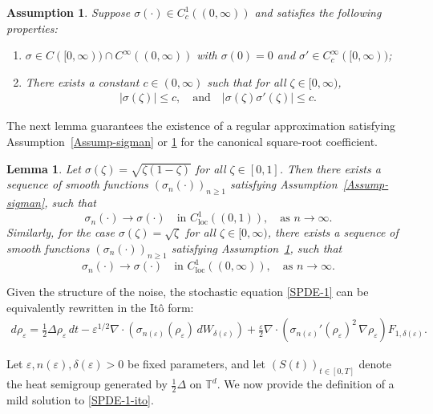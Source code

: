 \documentclass[UTF-8,reqno]{amsart}
\numberwithin{equation}{section}
\newtheorem{lemma}[theorem]{Lemma}
\newtheorem{assumption}{Assumption}[section]
\def\geq{\geqslant}
\def\leq{\leqslant}
\def\geq{\geqslant}
\def\leq{\leqslant}
\begin{document}
\begin{assumption}\label{Assump-sigman-sqrt}
Suppose $\sigma(\cdot) \in C^{1}_{c}((0,\infty))$ and satisfies the following properties:
\begin{enumerate}
    \item[(1)] $\sigma \in C([0,\infty)) \cap C^{\infty}((0,\infty))$ with $\sigma(0)=0$ and $\sigma' \in C^{\infty}_c([0,\infty))$;
    \item[(2)] There exists a constant $c \in (0,\infty)$ such that for all $\zeta \in [0,\infty)$,
    \begin{align}
        |\sigma(\zeta)| \leq c, \quad \text{and} \quad |\sigma(\zeta)\sigma'(\zeta)| \leq c.
    \end{align}
\end{enumerate}
\end{assumption}

The next lemma guarantees the existence of a regular approximation satisfying Assumption~\ref{Assump-sigman} or \ref{Assump-sigman-sqrt} for the canonical square-root coefficient.

\begin{lemma}\label{lem-sigma}
Let $\sigma(\zeta) = \sqrt{\zeta(1 - \zeta)}$ for all $\zeta \in [0,1]$. Then there exists a sequence of smooth functions $(\sigma_n(\cdot))_{n \geq 1}$ satisfying Assumption~\ref{Assump-sigman}, such that
$$
\sigma_n(\cdot) \longrightarrow \sigma(\cdot) \quad \text{in } C^1_{\mathrm{loc}}((0,1)), \quad \text{as } n \to \infty.
$$
Similarly, for the case $\sigma(\zeta) = \sqrt{\zeta}$ for all $\zeta \in [0,\infty)$, there exists a sequence of smooth functions $(\sigma_n(\cdot))_{n \geq 1}$ satisfying Assumption~\ref{Assump-sigman-sqrt}, such that
$$
\sigma_n(\cdot) \longrightarrow \sigma(\cdot) \quad \text{in } C^1_{\mathrm{loc}}((0,\infty)), \quad \text{as } n \to \infty.
$$

 \end{lemma}
Given the structure of the noise, the stochastic equation \eqref{SPDE-1} can be equivalently rewritten in the It\^o form:
\begin{align}\label{SPDE-1-ito}
d\rho_{\varepsilon} = \frac{1}{2}\Delta \rho_{\varepsilon}\,dt - \varepsilon^{1/2} \nabla\cdot\left(\sigma_{n(\varepsilon)}(\rho_{\varepsilon})\, dW_{\delta(\varepsilon)}\right) + \frac{\varepsilon}{2} \nabla\cdot\left(\sigma_{n(\varepsilon)}'(\rho_{\varepsilon})^2\, \nabla \rho_{\varepsilon} \right) F_{1,\delta(\varepsilon)}.
\end{align}

Let $\varepsilon, n(\varepsilon), \delta(\varepsilon) > 0$ be fixed parameters, and let $(S(t))_{t \in [0,T]}$ denote the heat semigroup generated by $\frac{1}{2}\Delta$ on $\mathbb{T}^d$. We now provide the definition of a mild solution to \eqref{SPDE-1-ito}.
\end{document}
